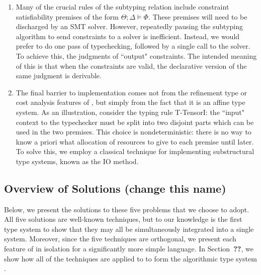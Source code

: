 \begin{enumerate}
  \item Many of the crucial rules of the \dlambdaamor subtyping relation include constraint satisfiability premises of the form $\Theta ; \Delta \vDash \Phi$. These premises will need to be discharged by an SMT solver. However, repeatedly pausing the subtyping algorithm to send constraints to a solver is inefficient. Instead, we would prefer to do one pass of typechecking, followed by a single call to the solver. To achieve this, the judgments of \bilambdaamor ``output" constraints. The intended meaning of this is that when the constraints are valid, the declarative version of the same judgment is derivable.
  
  \item The final barrier to implementation comes not from the refinement type or cost analysis features of \dlambdaamor, but simply from the fact that it is an affine type system. As an illustration, consider the typing rule T-TensorI: the ``input" context to the typechecker must be split into two disjoint parts which can be used in the two premises. This choice is nondeterministic: there is no way to know a priori what allocation of resources to give to each premise until later. To solve this, we employ a classical technique for implementing substructural type systems, known as  the IO method.

\end{enumerate}


\subsection{Overview of Solutions (change this name)}

Below, we present the solutions to these five problems that we choose to adopt. All five solutions are well-known techniques, but to our knowledge  \bilambdaamor is the first type system to show that they may all be simultaneously integrated into a single system. Moreover, since the five techniques are orthogonal, we present each feature of \bilambdaamor in isolation for a significantly more simple language. In Section~\textbf{??}, we show how all of the techniques are applied to \dlambdaamor to form the algorithmic type system \bilambdaamor.

